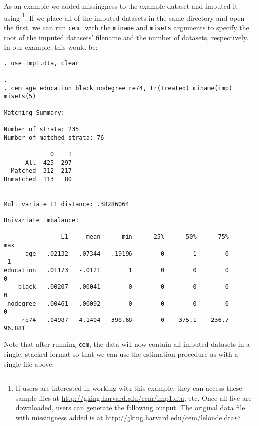 \documentclass[11pt]{article}
\newcommand{\cem}{\texttt{cem }}
\begin{document}
As an example we added missingness to the example dataset and imputed it
using \citet{HonKinBLa10}\footnote{If users are interested in working with
  this example, they can access these sample files at
  \url{http://gking.harvard.edu/cem/imp1.dta}, etc. Once all five are
  downloaded, users can generate the following output. The original data
  file with missingness added is at
  \url{http://gking.harvard.edu/cem/lelonde.dta}}. If we place all of the
imputed datasets in the same directory and open the first, we can run  \cem
with the \texttt{miname} and \texttt{misets} arguments to specify the
root of the imputed datasets' filename and the number of datasets,
respectively.  In our example, this would be:

\begin{verbatim}
. use imp1.dta, clear

. 
. cem age education black nodegree re74, tr(treated) miname(imp) misets(5)

Matching Summary:
-----------------
Number of strata: 235
Number of matched strata: 76

             0    1
      All  425  297
  Matched  312  217
Unmatched  113   80


Multivariate L1 distance: .38286064

Univariate imbalance:

                L1     mean      min      25%      50%      75%      max
      age   .02132  -.07344   .19196        0        1        0       -1
education   .01173   -.0121        1        0        0        0        0
    black   .00207   .00041        0        0        0        0        0
 nodegree   .00461  -.00092        0        0        0        0        0
     re74   .04987  -4.1404  -398.68        0    375.1   -236.7   96.881

\end{verbatim}

Note that after running \texttt{cem}, the data will now contain all imputed datasets in a single, stacked format so that we can use the estimation procedure as with a single file above. 


\end{document}
